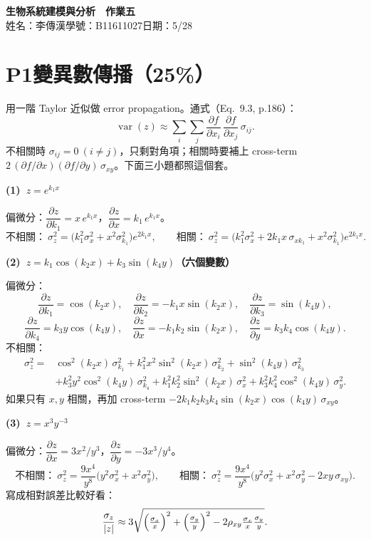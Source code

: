 \documentclass[11pt]{article}
\newcommand{\pd}[2]{\dfrac{\partial #1}{\partial #2}}
\begin{document}
\begin{center}
  {\Large\bfseries 生物系統建模與分析　作業五}\\[4pt]
  姓名：李傳漢\quad 學號：B11611027\quad 日期：5/28
\end{center}

\vspace{0.3em}

\section{P1\quad 變異數傳播（25\%）}

用一階 Taylor 近似做 error propagation。通式（Eq.\ 9.3, p.186）：
\[
  \operatorname{var}(z)\approx\sum_i\sum_j \pd{f}{x_i}\,\pd{f}{x_j}\,\sigma_{ij}.
\]
不相關時 $\sigma_{ij}=0\ (i\neq j)$，只剩對角項；相關時要補上 cross-term
$2\,(\partial f/\partial x)(\partial f/\partial y)\,\sigma_{xy}$。下面三小題都照這個套。

\medskip
\textbf{(1)\ $z=e^{k_1 x}$}

偏微分：$\pd{z}{k_1}=x\,e^{k_1 x}$，$\pd{z}{x}=k_1\,e^{k_1 x}$。
\[
  \text{不相關：}\ \sigma_z^{2}=\bigl(k_1^{2}\sigma_x^{2}+x^{2}\sigma_{k_1}^{2}\bigr)e^{2k_1 x},
  \qquad
  \text{相關：}\ \sigma_z^{2}=\bigl(k_1^{2}\sigma_x^{2}+2k_1 x\,\sigma_{xk_1}+x^{2}\sigma_{k_1}^{2}\bigr)e^{2k_1 x}.
\]

\medskip
\textbf{(2)\ $z=k_1\cos(k_2 x)+k_3\sin(k_4 y)$（六個變數）}

偏微分：
\[
  \pd{z}{k_1}=\cos(k_2x),\quad \pd{z}{k_2}=-k_1 x\sin(k_2x),\quad \pd{z}{k_3}=\sin(k_4y),
\]
\[
  \pd{z}{k_4}=k_3 y\cos(k_4y),\quad \pd{z}{x}=-k_1k_2\sin(k_2x),\quad \pd{z}{y}=k_3k_4\cos(k_4y).
\]
不相關：
\[
  \begin{aligned}
  \sigma_z^{2}={}&\cos^{2}(k_2x)\,\sigma_{k_1}^{2}+k_1^{2}x^{2}\sin^{2}(k_2x)\,\sigma_{k_2}^{2}
      +\sin^{2}(k_4y)\,\sigma_{k_3}^{2}\\
   &+k_3^{2}y^{2}\cos^{2}(k_4y)\,\sigma_{k_4}^{2}
      +k_1^{2}k_2^{2}\sin^{2}(k_2x)\,\sigma_x^{2}
      +k_3^{2}k_4^{2}\cos^{2}(k_4y)\,\sigma_y^{2}.
  \end{aligned}
\]
如果只有 $x,y$ 相關，再加 cross-term $-2k_1k_2k_3k_4\sin(k_2x)\cos(k_4y)\,\sigma_{xy}$。

\medskip
\textbf{(3)\ $z=x^{3}y^{-3}$}

偏微分：$\pd{z}{x}=3x^{2}/y^{3}$，$\pd{z}{y}=-3x^{3}/y^{4}$。
\[
  \text{不相關：}\ \sigma_z^{2}=\frac{9x^{4}}{y^{8}}\bigl(y^{2}\sigma_x^{2}+x^{2}\sigma_y^{2}\bigr),
  \qquad
  \text{相關：}\ \sigma_z^{2}=\frac{9x^{4}}{y^{8}}\bigl(y^{2}\sigma_x^{2}+x^{2}\sigma_y^{2}-2xy\,\sigma_{xy}\bigr).
\]
寫成相對誤差比較好看：
\[
  \frac{\sigma_z}{|z|}\approx 3\sqrt{\Bigl(\tfrac{\sigma_x}{x}\Bigr)^{2}
      +\Bigl(\tfrac{\sigma_y}{y}\Bigr)^{2}
      -2\rho_{xy}\tfrac{\sigma_x}{x}\tfrac{\sigma_y}{y}}.
\]
\end{document}
